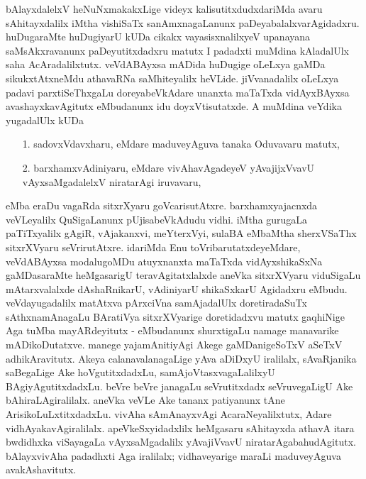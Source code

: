 bAlayxdalelxV heNuNxmakakxLige videyx kalisutitxdudxdariMda avaru sAhitayxdalilx iMtha vishiSaTx sanAmxnagaLanunx paDeyabalalxvarAgidadxru. huDugaraMte huDugiyarU kUDa cikakx vayasisxnalilxyeV upanayana saMsAkxravanunx paDeyutitxdadxru matutx I padadxti muMdina kAladalUlx saha AcAradalilxtutx. veVdABAyxsa mADida huDugige oLeLxya gaMDa sikukxtAtxneMdu athavaRNa saMhiteyalilx heVLide. jiVvanadalilx oLeLxya padavi parxtiSeThxgaLu doreyabeVkAdare unanxta maTaTxda vidAyxBAyxsa avashayxkavAgitutx eMbudanunx idu doyxVtisutatxde. A muMdina veYdika yugadalUlx kUDa 
\begin{enumerate}
\itemsep=0pt
\item[{\rm 1.}] sadovxVdavxharu, eMdare maduveyAguva tanaka Oduvavaru matutx,
\item[{\rm 2.}] barxhamxvAdiniyaru, eMdare vivAhavAgadeyeV yAvajijxVvavU vAyxsaMgadalelxV niratarAgi iruvavaru, 
\end{enumerate}
eMba eraDu vagaRda sitxrXyaru goVcarisutAtxre. barxhamxyajacnxda veVLeyalilx QuSigaLanunx pUjisabeVkAdudu vidhi. iMtha gurugaLa paTiTxyalilx gAgiR, vAjakanxvi, meYterxVyi, sulaBA eMbaMtha sherxVSaThx sitxrXVyaru seVrirutAtxre. idariMda Enu toVribarutatxdeyeMdare, veVdABAyxsa modalugoMDu atuyxnanxta maTaTxda vidAyxshikaSxNa gaMDasaraMte heMgasarigU teravAgitatxlalxde aneVka sitxrXVyaru viduSigaLu mAtarxvalalxde dAshaRnikarU, vAdiniyarU shikaSxkarU Agidadxru eMbudu. veVdayugadalilx matAtxva pArxciVna samAjadalUlx doretiradaSuTx sAthxnamAnagaLu BAratiVya sitxrXVyarige doretidadxvu matutx gaqhiNige Aga tuMba mayARdeyitutx - eMbudanunx shurxtigaLu namage manavarike mADikoDutatxve. manege yajamAnitiyAgi Akege gaMDanigeSoTxV aSeTxV adhikAravitutx. Akeya calanavalanagaLige yAva aDiDxyU iralilalx, sAvaRjanika saBegaLige Ake hoVgutitxdadxLu, samAjoVtasxvagaLalilxyU BAgiyAgutitxdadxLu. beVre beVre janagaLu seVrutitxdadx seVruvegaLigU Ake bAhiraLAgiralilalx. aneVka veVLe Ake tananx patiyanunx tAne ArisikoLuLxtitxdadxLu. vivAha sAmAnayxvAgi AcaraNeyalilxtutx, Adare vidhAyakavAgiralilalx. apeVkeSxyidadxlilx heMgasaru sAhitayxda athavA itara bwdidhxka viSayagaLa vAyxsaMgadalilx yAvajiVvavU niratarAgabahudAgitutx. bAlayxvivAha padadhxti Aga iralilalx; vidhaveyarige maraLi maduveyAguva avakAshavitutx. 

